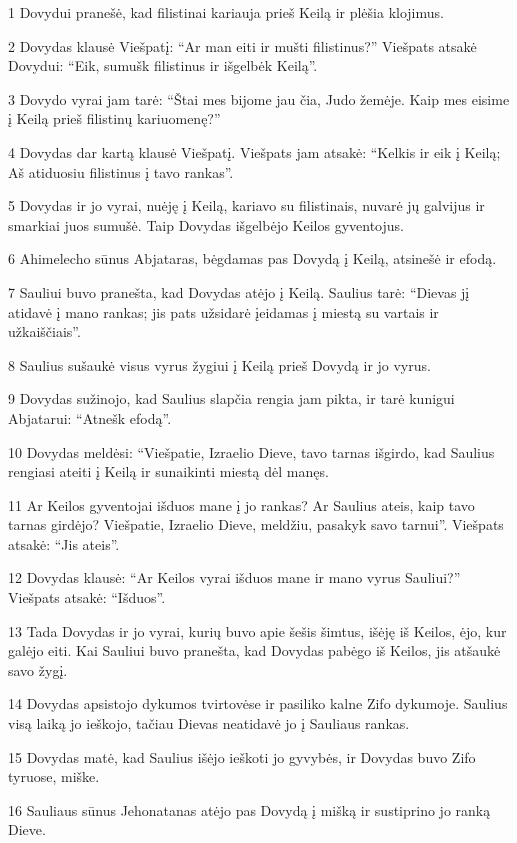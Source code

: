 \par 1 Dovydui pranešė, kad filistinai kariauja prieš Keilą ir plėšia klojimus. 
\par 2 Dovydas klausė Viešpatį: “Ar man eiti ir mušti filistinus?” Viešpats atsakė Dovydui: “Eik, sumušk filistinus ir išgelbėk Keilą”. 
\par 3 Dovydo vyrai jam tarė: “Štai mes bijome jau čia, Judo žemėje. Kaip mes eisime į Keilą prieš filistinų kariuomenę?” 
\par 4 Dovydas dar kartą klausė Viešpatį. Viešpats jam atsakė: “Kelkis ir eik į Keilą; Aš atiduosiu filistinus į tavo rankas”. 
\par 5 Dovydas ir jo vyrai, nuėję į Keilą, kariavo su filistinais, nuvarė jų galvijus ir smarkiai juos sumušė. Taip Dovydas išgelbėjo Keilos gyventojus. 
\par 6 Ahimelecho sūnus Abjataras, bėgdamas pas Dovydą į Keilą, atsinešė ir efodą. 
\par 7 Sauliui buvo pranešta, kad Dovydas atėjo į Keilą. Saulius tarė: “Dievas jį atidavė į mano rankas; jis pats užsidarė įeidamas į miestą su vartais ir užkaiščiais”. 
\par 8 Saulius sušaukė visus vyrus žygiui į Keilą prieš Dovydą ir jo vyrus. 
\par 9 Dovydas sužinojo, kad Saulius slapčia rengia jam pikta, ir tarė kunigui Abjatarui: “Atnešk efodą”. 
\par 10 Dovydas meldėsi: “Viešpatie, Izraelio Dieve, tavo tarnas išgirdo, kad Saulius rengiasi ateiti į Keilą ir sunaikinti miestą dėl manęs. 
\par 11 Ar Keilos gyventojai išduos mane į jo rankas? Ar Saulius ateis, kaip tavo tarnas girdėjo? Viešpatie, Izraelio Dieve, meldžiu, pasakyk savo tarnui”. Viešpats atsakė: “Jis ateis”. 
\par 12 Dovydas klausė: “Ar Keilos vyrai išduos mane ir mano vyrus Sauliui?” Viešpats atsakė: “Išduos”. 
\par 13 Tada Dovydas ir jo vyrai, kurių buvo apie šešis šimtus, išėję iš Keilos, ėjo, kur galėjo eiti. Kai Sauliui buvo pranešta, kad Dovydas pabėgo iš Keilos, jis atšaukė savo žygį. 
\par 14 Dovydas apsistojo dykumos tvirtovėse ir pasiliko kalne Zifo dykumoje. Saulius visą laiką jo ieškojo, tačiau Dievas neatidavė jo į Sauliaus rankas. 
\par 15 Dovydas matė, kad Saulius išėjo ieškoti jo gyvybės, ir Dovydas buvo Zifo tyruose, miške. 
\par 16 Sauliaus sūnus Jehonatanas atėjo pas Dovydą į mišką ir sustiprino jo ranką Dieve. 

